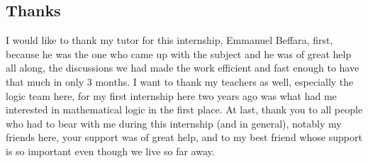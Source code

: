 \subsection*{Thanks}

I would like to thank my tutor for this internship, Emmanuel Beffara, first, because he was the one who came up with the subject and he was of great help all along, the discussions we had made the work efficient and fast enough to have that much in only 3 months. I want to thank my teachers as well, especially the logic team here, for my first internship here two years ago was what had me interested in mathematical logic in the first place. At last, thank you to all people who had to bear with me during this internship (and in general), notably my friends here, your support was of great help, and to my best friend whose support is so important even though we live so far away.